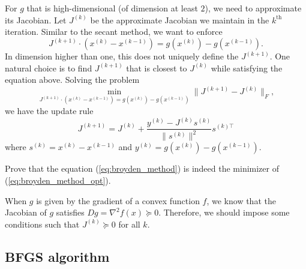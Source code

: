 For $g$ that is high-dimensional (of dimension at least $2$), we
need to approximate its Jacobian. Let $J^{(k)}$ be the approximate
Jacobian we maintain in the $k^{\mathrm{th}}$ iteration. Similar
to the secant method, we want to enforce
\[
J^{(k+1)}\cdot(x^{(k)}-x^{(k-1)})=g(x^{(k)})-g(x^{(k-1)}).
\]
In dimension higher than one, this does not uniquely define the $J^{(k+1)}$.
One natural choice is to find $J^{(k+1)}$ that is closest to $J^{(k)}$
while satisfying the equation above. Solving the problem
\begin{equation}
\min_{J^{(k+1)}\cdot(x^{(k)}-x^{(k-1)})=g(x^{(k)})-g(x^{(k-1)})}\|J^{(k+1)}-J^{(k)}\|_{F},\label{eq:broyden_method_opt}
\end{equation}
we have the update rule
\begin{equation}
J^{(k+1)}=J^{(k)}+\frac{y^{(k)}-J^{(k)}s^{(k)}}{\|s^{(k)}\|^{2}}s^{(k)\top}\label{eq:broyden_method}
\end{equation}
where $s^{(k)}=x^{(k)}-x^{(k-1)}$ and $y^{(k)}=g(x^{(k)})-g(x^{(k-1)})$.
\begin{xca}
Prove that the equation (\ref{eq:broyden_method}) is indeed the minimizer
of (\ref{eq:broyden_method_opt}).
\end{xca}

When $g$ is given by the gradient of a convex function $f$, we know
that the Jacobian of $g$ satisfies $Dg=\nabla^{2}f(x)\succeq0$.
Therefore, we should impose some conditions such that $J^{(k)}\succeq0$
for all $k$.

\subsection*{BFGS algorithm}

